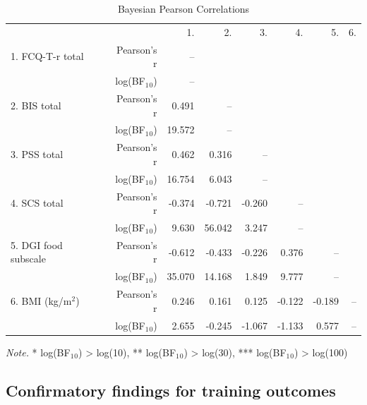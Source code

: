 \documentclass[man,floatsintext]{apa6}
\begin{document}
\begin{table}[h]
    \centering
    \caption{Bayesian Pearson Correlations}
    \label{tab:bayesianPearsonCorrelations}
    {
        \begin{tabular}{lrrrrrrr}
            \toprule
             &  & 1. & 2. & 3. & 4. & 5. & 6.  \\
            \cmidrule[0.4pt]{1-8}
            1$.$ FCQ-T-r total & Pearson's r & -- &   &   &   &   &    \\
             & log(BF$_{1}$$_{0}$) & -- &  &  &  &  &   \\
            2$.$ BIS total & Pearson's r & 0.491 & -- &   &   &   &    \\
             & log(BF$_{1}$$_{0}$) & 19.572 & -- &  &  &  &   \\
            3$.$ PSS total & Pearson's r & 0.462 & 0.316 & -- &   &   &    \\
             & log(BF$_{1}$$_{0}$) & 16.754 & 6.043 & -- &  &  &   \\
            4$.$ SCS total & Pearson's r & -0.374 & -0.721 & -0.260 & -- &   &    \\
             & log(BF$_{1}$$_{0}$) & 9.630 & 56.042 & 3.247 & -- &  &   \\
            5$.$ DGI food subscale & Pearson's r & -0.612 & -0.433 & -0.226 & 0.376 & -- &    \\
             & log(BF$_{1}$$_{0}$) & 35.070 & 14.168 & 1.849 & 9.777 & -- &   \\
            6$.$ BMI (kg/m$^{2}$) & Pearson's r & 0.246 & 0.161 & 0.125 & -0.122 & -0.189 & --  \\
             & log(BF$_{1}$$_{0}$) & 2.655 & -0.245 & -1.067 & -1.133 & 0.577 & --  \\
            \bottomrule
        \end{tabular}
    }
    \begin{tablenotes}[para]
\footnotesize{\textit{Note.} * log(BF$_{1}$$_{0}$)  > log(10), **  log(BF$_{1}$$_{0}$)  > log(30), ***  log(BF$_{1}$$_{0}$)  > log(100)}
\end{tablenotes}
\end{table}

\subsection{Confirmatory findings for training
outcomes}\label{confirmatory-findings-for-training-outcomes}
\end{document}
